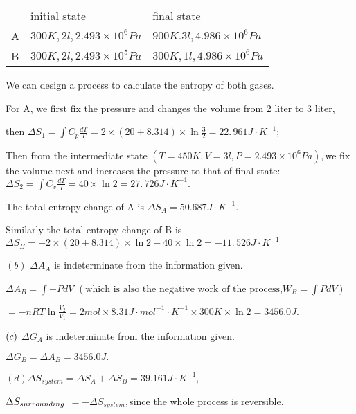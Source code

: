 \documentclass{article}
\begin{document}
\begin{tabular}{lll}
& initial state & final state \\ 
A & $300\unit{K},2\unit{l},2.493\times 10^{6}\unit{Pa}$ & $\allowbreak 900%
\unit{K}.3\unit{l},4.986\times 10^{6}\unit{Pa}$ \\ 
B & $300\unit{K},2\unit{l},2.493\times 10^{5}\unit{Pa}$ & $300\unit{K},1%
\unit{l},4.986\times 10^{6}\unit{Pa}$%
\end{tabular}

We can design a process to calculate the entropy of both gases.

For A, we first fix the pressure and changes the volume from 2 liter to 3
liter,

then $\Delta S_{1}=\int C_{p}\frac{dT}{T}=2\times \left( 20+8.314\right)
\times \ln \frac{3}{2}=\allowbreak 22.\,\allowbreak 961\unit{J}\cdot \unit{K}%
^{-1};$

Then from the intermediate state $\left( T=450\unit{K},V=3\unit{l}%
,P=2.493\times 10^{6}\unit{Pa}\right) ,$we fix the volume next and increases
the pressure to that of final state: $\Delta S_{2}=\int C_{v}\frac{dT}{T}%
=40\times \ln 2=\allowbreak 27.\,\allowbreak 726\unit{J}\cdot \unit{K}^{-1}.$

The total entropy change of A is $\allowbreak \Delta S_{A}=50.687\unit{J}%
\cdot \unit{K}^{-1}.$

Similarly the total entropy change of B is $\Delta S_{B}=-2\times \left(
20+8.314\right) \times \ln 2+40\times \ln 2=\allowbreak -11.\,\allowbreak 526%
\unit{J}\cdot \unit{K}^{-1}$

$\left( b\right) $ $\Delta A_{A}$ is indeterminate from the information
given. 

$\Delta A_{B}=\int -PdV$ $\left( \text{which is also the negative work of
the process,}W_{B}=\int PdV\right) $

$=-nRT\ln \frac{V_{2}}{V_{1}}=2\unit{mol}\times 8.31\unit{J}\cdot \unit{mol}%
^{-1}\cdot \unit{K}^{-1}\times 300\unit{K}\times \ln 2=\allowbreak 3456.0%
\unit{J}.$

$\bigskip \left( c\right) $ $\Delta G_{A}$ is indeterminate from the
information given. 

$\Delta G_{B}=\Delta A_{B}=\allowbreak 3456.0\unit{J}.$

$\left( d\right) \Delta S_{system}=\Delta S_{A}+\Delta S_{B}=39.161\unit{J}%
\cdot \unit{K}^{-1},$

$\bigskip \Delta S_{surrounding}$ $=-\Delta S_{system},$since the whole
process is reversible.
\end{document}
